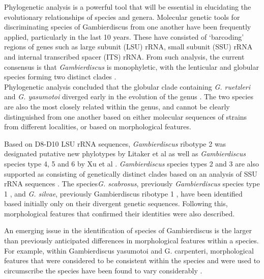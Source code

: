 \documentclass[12pt]{article}
\begin{document}
Phylogenetic analysis is a powerful tool that will be essential in elucidating the evolutionary relationships of species and genera. Molecular genetic tools for discriminating species of Gambierdiscus from one another have been frequently applied, particularly in the last 10 years. These have consisted of ‘barcoding’ regions of genes such as large subunit (LSU) rRNA, small subunit (SSU) rRNA and internal transcribed spacer (ITS) rRNA. From such analysis, the current consensus is that \emph{Gambierdiscus} is monophyletic, with the lenticular and globular species forming two distinct clades \cite{chinain1999morphology,litaker2009taxonomy,fraga2011gambierdiscus,richlen2008phylogeography,kuno2010genetic,litaker2010global,nishimura2013genetic}. \\
Phylogenetic analysis concluded that the globular clade containing \emph{G. ruetzleri} and \emph{G. yasumotoi} diverged early in the evolution of the genus \cite{litaker2009taxonomy,nishimura2013genetic}. The two species are also the most closely related within the genus, and cannot be clearly distinguished from one another based on either molecular sequences of strains from different localities, or based on morphological features. 

Based on D8-D10 LSU rRNA sequences, \emph{Gambierdiscus} ribotype 2 was designated putative new phylotypes by Litaker et al \cite{litaker2010global} as well as \emph{Gambierdiscus} species type 4, 5 and 6 by Xu et al \cite{xu2014distribution}. \emph{Gambierdiscus} species types 2 and 3 are also supported as consisting of genetically distinct clades based on an analysis of SSU rRNA sequences \cite{nishimura2013genetic,kuno2010genetic}. The species\emph{G. scabrosus}, previously \emph{Gambierdiscus} species type 1 \cite{nishimura2013genetic,nishimura2014morphology},  and \emph{G. silvae}, previously Gambierdiscus ribotype 1 \cite{fraga2014genus}, have been identified based initially only on their divergent genetic sequences. Following this, morphological features that confirmed their identities were also described. 

An emerging issue in the identification of species of Gambierdiscus is the larger than previously anticipated differences in morphological features within a species. For example, within Gambierdiscus yasumotoi and G. carpenteri, morphological features that were considered to be consistent within the species and were used to circumscribe the species have been found to vary considerably \cite{murray2014molecular,kohli2014high}.
\end{document}
